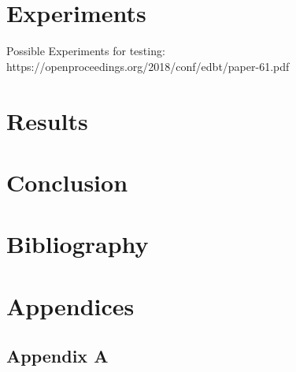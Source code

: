 \documentclass{article}
\begin{document}
\newpage
\section{Experiments}
Possible Experiments for testing:
https://openproceedings.org/2018/conf/edbt/paper-61.pdf

\newpage
\section{Results}


\newpage
\section{Conclusion}


\newpage
\section{Bibliography}


\newpage
\section{Appendices}
\subsection{Appendix A}
\end{document}
